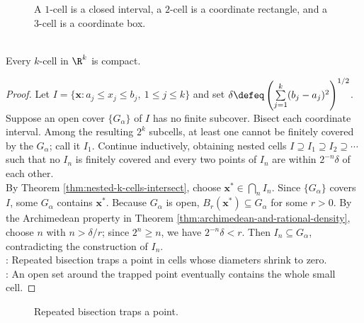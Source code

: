 \begin{figure}[H]
  \centering
  
  \caption{A $1$-cell is a closed interval, a $2$-cell is a coordinate rectangle, and a $3$-cell is a coordinate box.}
  \label{fig:k-cell-low-dimensional-examples}
\end{figure}

\begin{theorem} \label{thm:k-cells-compact} \\
Every $k$-cell in $\R^k$ is compact.
\begin{proof}
Let $I=\{\mathbf{x}:a_j\leq x_j\leq b_j,\ 1\leq j\leq k\}$ and set $\delta\defeq\left(\sum
\limits_{j=1}^{k}(b_j-a_j)^2\right)^{1/2}$. Suppose an open cover $\{G_\alpha\}$ of $I$ has no finite subcover. Bisect each coordinate interval. Among the resulting $2^k$ subcells, at least one cannot be finitely covered by the $G_\alpha$; call it $I_1$. Continue inductively, obtaining nested cells $I\supseteq I_1\supseteq I_2\supseteq\cdots$ such that no $I_n$ is finitely covered and every two points of $I_n$ are within $2^{-n}\delta$ of each other.\\
By Theorem \ref{thm:nested-k-cells-intersect}, choose $\mathbf{x}^*\in\bigcap_n I_n$. Since $\{G_\alpha\}$ covers $I$, some $G_\alpha$ contains $\mathbf{x}^*$. Because $G_\alpha$ is open, $B_r(\mathbf{x}^*)\subseteq G_\alpha$ for some $r>0$. By the Archimedean property in Theorem \ref{thm:archimedean-and-rational-density}, choose $n$ with $n>\delta/r$; since $2^n\geq n$, we have $2^{-n}\delta<r$. Then $I_n\subseteq G_\alpha$, contradicting the construction of $I_n$.\\
: Repeated bisection traps a point in cells whose diameters shrink to zero.\\
: An open set around the trapped point eventually contains the whole small cell.
\end{proof}
\end{theorem}

\begin{figure}[H]
  \centering
  
  \caption{Repeated bisection traps a point.}
  \label{fig:k-cell-bisection-compactness}
\end{figure}

